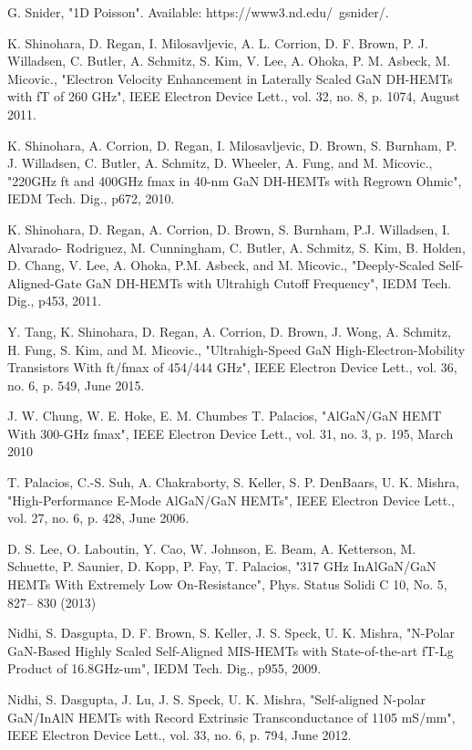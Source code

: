 \documentclass[journal]{IEEEtran}
\begin{document}
\begin{thebibliography}{00}
 G. Snider, "1D Poisson".  Available: https://www3.nd.edu/~gsnider/.

 K. Shinohara, D. Regan, I. Milosavljevic, A. L. Corrion, D. F. Brown, P. J. Willadsen, C. Butler, A. Schmitz, S. Kim, V. Lee, A. Ohoka, P. M. Asbeck, M. Micovic., "Electron Velocity Enhancement in Laterally Scaled GaN DH-HEMTs with fT of 260 GHz", IEEE Electron Device Lett., vol. 32, no. 8, p. 1074, August 2011.

 K. Shinohara, A. Corrion, D. Regan, I. Milosavljevic, D. Brown, S. Burnham, P. J. Willadsen, C. Butler, A. Schmitz, D. Wheeler, A. Fung, and M. Micovic., "220GHz ft and 400GHz fmax in 40-nm GaN DH-HEMTs with Regrown Ohmic", IEDM Tech. Dig., p672, 2010.

 K. Shinohara, D. Regan, A. Corrion, D. Brown, S. Burnham, P.J. Willadsen, I. Alvarado- Rodriguez, M. Cunningham, C. Butler, A. Schmitz, S. Kim, B. Holden, D. Chang, V. Lee, A. Ohoka, P.M. Asbeck, and M. Micovic., "Deeply-Scaled Self-Aligned-Gate GaN DH-HEMTs with Ultrahigh Cutoff Frequency", IEDM Tech. Dig., p453, 2011.

 Y. Tang, K. Shinohara, D. Regan, A. Corrion, D. Brown, J. Wong, A. Schmitz, H. Fung, S. Kim, and M. Micovic., "Ultrahigh-Speed GaN High-Electron-Mobility Transistors With ft/fmax of 454/444 GHz",  IEEE Electron Device Lett., vol. 36, no. 6, p. 549, June 2015.

 J. W. Chung, W. E. Hoke, E. M. Chumbes T. Palacios, "AlGaN/GaN HEMT With 300-GHz fmax",  IEEE Electron Device Lett., vol. 31, no. 3, p. 195, March 2010

 T. Palacios, C.-S. Suh, A. Chakraborty, S. Keller, S. P. DenBaars, U. K. Mishra, "High-Performance E-Mode AlGaN/GaN HEMTs", IEEE Electron Device Lett., vol. 27, no. 6, p. 428, June 2006.

 D. S. Lee, O. Laboutin, Y. Cao, W. Johnson, E. Beam, A. Ketterson, M. Schuette, P. Saunier, D. Kopp, P. Fay, T. Palacios, "317 GHz InAlGaN/GaN HEMTs With Extremely Low On-Resistance", Phys. Status Solidi C 10, No. 5, 827– 830 (2013)

 Nidhi, S. Dasgupta, D. F. Brown, S. Keller, J. S. Speck, U. K. Mishra, "N-Polar GaN-Based Highly Scaled Self-Aligned MIS-HEMTs with State-of-the-art fT-Lg Product of 16.8GHz-um", IEDM Tech. Dig., p955, 2009.

 Nidhi, S. Dasgupta, J. Lu, J. S. Speck, U. K. Mishra, "Self-aligned N-polar GaN/InAlN HEMTs with Record Extrinsic Transconductance of 1105 mS/mm",  IEEE Electron Device Lett., vol. 33, no. 6, p. 794, June 2012.


\end{thebibliography}
\end{document}
